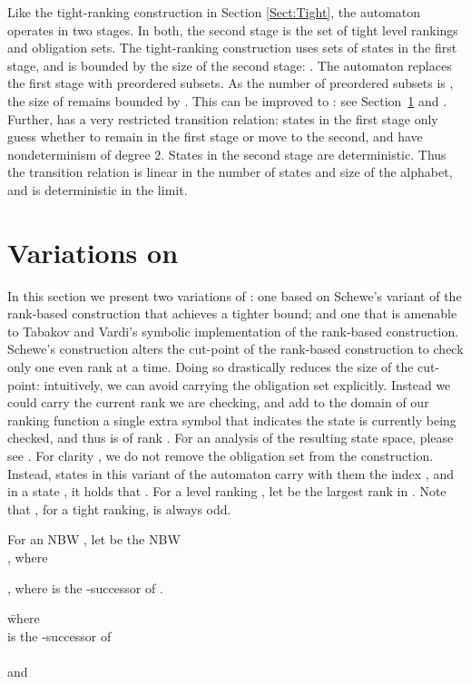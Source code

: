 \documentclass{LMCS}
\begin{document}
 Like the tight-ranking construction in Section \ref{Sect:Tight}, the
automaton  operates in two stages. In both, the second stage is the set of tight level
rankings and obligation sets. The tight-ranking construction uses
sets of states in the first stage, and is bounded by the size of the second stage: 
\cite{FKV06}.  The automaton  replaces the first stage with preordered subsets.
As the number of preordered subsets is  \cite{Var80}, the
size of  remains bounded by . This can be improved to : see
Section~\ref{App:Variants} and \cite{Sch09}. 
Further,  has a very restricted transition relation: states in the first stage only
guess whether to remain in the first stage or move to the second, and have nondeterminism of
degree 2. States in the second stage are deterministic.  Thus the transition relation is linear in
the number of states and size of the alphabet, and  is deterministic in the limit.

\section{Variations on }\label{App:Variants}
\cbstart

In this section we present two variations of : one based on Schewe's variant of the
rank-based construction that achieves a tighter bound; and one that is amenable to Tabakov and
Vardi's symbolic implementation of the rank-based construction.
Schewe's construction alters the cut-point of the rank-based construction to check only one even
rank at a time. Doing so drastically reduces the size of the cut-point: intuitively, we can avoid
carrying the obligation set explicitly. Instead we could carry the current rank  we are checking,
and add to the domain of our ranking function a single extra symbol  that indicates the state is
currently being checked, and thus is of rank .  For an analysis of the resulting state space,
please see \cite{Sch09}. For clarity , we do not remove the obligation set from the construction.
Instead, states in this variant of the automaton carry with them the index , and in a state
, it holds that . For a level ranking , let
 be the largest rank in . Note that , for a tight ranking, is always
odd.

\begin{defi}\label{Stable_Rank_Schewe}
For an NBW , let  be the NBW\\
, where
\begin{iteMize}{}
\item ,
where  is the -successor of .
\item \begin{tabbing}
 \=where\\
           \> is the -successor of \\
           \>\\
           \>and 
\end{tabbing}
\item 
\end{iteMize}
\end{defi}
\end{document}
